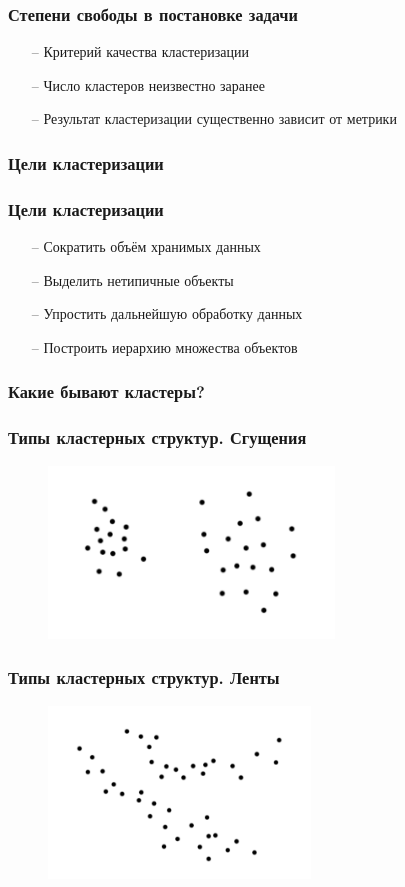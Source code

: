 \documentclass[12pt]{beamer}
\begin{document}
\begin{frame}\frametitle{Степени свободы в постановке задачи}
	\begin{itemize}
		\item[--] Критерий качества кластеризации
		\item[--] Число кластеров неизвестно заранее
		\item[--] Результат кластеризации существенно зависит от метрики
	\end{itemize}
\end{frame}

\begin{frame}\frametitle{Цели кластеризации}
\end{frame}

\begin{frame}\frametitle{Цели кластеризации}
	\begin{itemize}
		\item[--] Сократить объём хранимых данных
		\item[--] Выделить нетипичные объекты
		\item[--] Упростить дальнейшую обработку данных
		\item[--] Построить иерархию множества объектов				
	\end{itemize}
\end{frame}

\begin{frame}\frametitle{Какие бывают кластеры?}
\end{frame}

\begin{frame}\frametitle{Типы кластерных структур. Сгущения}
\begin{figure}[htbp]
  \includegraphics[height=130pt, keepaspectratio = true]{images/cluster1}  
\end{figure}
\end{frame}

\begin{frame}\frametitle{Типы кластерных структур. Ленты}
\begin{figure}[htbp]
  \includegraphics[height=130pt, keepaspectratio = true]{images/cluster2}  
\end{figure}
\end{frame}
\end{document}
